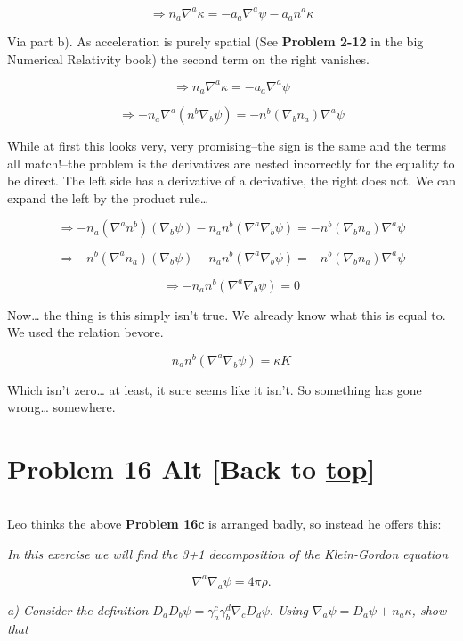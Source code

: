 \documentclass[landscape,letterpaper,10pt,english]{article}
\begin{document}
\[ \Rightarrow n_a \nabla^a \kappa = - a_a \nabla^a \psi - a_an^a\kappa\]

Via part b). As acceleration is purely spatial (See \textbf{Problem
2-12} in the big Numerical Relativity book) the second term on the right
vanishes.

\[ \Rightarrow n_a \nabla^a \kappa = - a_a \nabla^a \psi\]

\[ \Rightarrow -n_a \nabla^a (n^b\nabla_b \psi) = - n^b (\nabla_b n_a) \nabla^a \psi\]

While at first this looks very, very promising--the sign is the same and
the terms all match!--the problem is the derivatives are nested
incorrectly for the equality to be direct. The left side has a
derivative of a derivative, the right does not. We can expand the left
by the product rule\ldots{}

\[ \Rightarrow -n_a (\nabla^a n^b)(\nabla_b \psi) -n_a n^b (\nabla^a\nabla_b \psi) = - n^b (\nabla_b n_a) \nabla^a \psi\]

\[ \Rightarrow -n^b (\nabla^a n_a)(\nabla_b \psi) -n_a n^b (\nabla^a\nabla_b \psi) = - n^b (\nabla_b n_a) \nabla^a \psi\]

\[ \Rightarrow  -n_a n^b (\nabla^a\nabla_b \psi) = 0\]

    Now\ldots{} the thing is this simply isn't true. We already know what
this is equal to. We used the relation bevore.

\[ n_a n^b (\nabla^a\nabla_b \psi) = \kappa K\]

Which isn't zero\ldots{} at least, it sure seems like it isn't. So
something has gone wrong\ldots{} somewhere.

    \hypertarget{problem-16-alt-back-to-top}{%
\section{\texorpdfstring{Problem 16 Alt {[}Back to
\hyperref[toc]{top}{]}}{Problem 16 Alt {[}Back to {]}}}\label{problem-16-alt-back-to-top}}

\[\label{P16A}\]

Leo thinks the above \textbf{Problem 16c} is arranged badly, so instead
he offers this:

    \emph{In this exercise we will find the 3+1 decomposition of the
Klein-Gordon equation}

\[ \nabla^a\nabla_a\psi = 4\pi \rho .\]

\emph{a) Consider the definition
\(D_aD_b\psi = \gamma^c_a\gamma^d_b\nabla_cD_d\psi.\) Using
\(\nabla_a\psi = D_a\psi + n_a \kappa\), show that}
\end{document}
